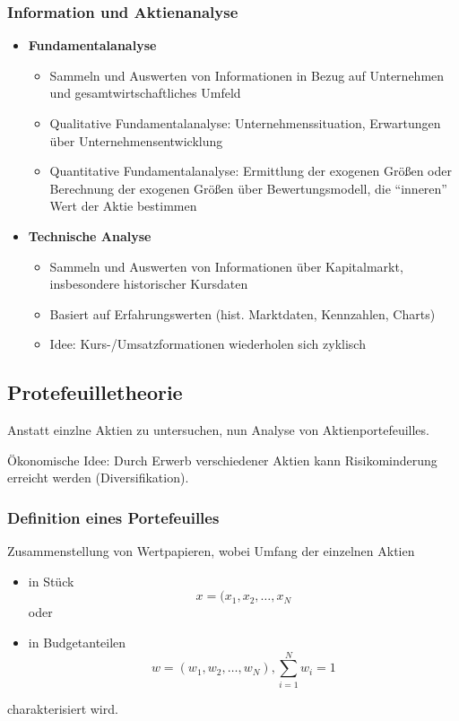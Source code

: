 \subsubsection{Information und Aktienanalyse}
\begin{itemize}
	\item \textbf{Fundamentalanalyse}
	\begin{itemize}
		\item Sammeln und Auswerten von Informationen in Bezug auf Unternehmen und gesamtwirtschaftliches Umfeld
		\item Qualitative Fundamentalanalyse: Unternehmenssituation, Erwartungen über Unternehmensentwicklung
		\item Quantitative Fundamentalanalyse: Ermittlung der exogenen Größen oder Berechnung der exogenen Größen über Bewertungsmodell, die "`inneren"' Wert der Aktie bestimmen
	\end{itemize}
	\item \textbf{Technische Analyse}
	\begin{itemize}
		\item Sammeln und Auswerten von Informationen über Kapitalmarkt, insbesondere historischer Kursdaten
		\item Basiert auf Erfahrungswerten (hist. Marktdaten, Kennzahlen, Charts)
		\item Idee: Kurs-/Umsatzformationen wiederholen sich zyklisch
	\end{itemize}
\end{itemize}


\subsection{Protefeuilletheorie}
Anstatt einzlne Aktien zu untersuchen, nun Analyse von Aktienportefeuilles.

Ökonomische Idee: Durch Erwerb verschiedener Aktien kann Risikominderung erreicht werden (Diversifikation).

\subsubsection{Definition eines Portefeuilles}
Zusammenstellung von Wertpapieren, wobei Umfang der einzelnen Aktien
\begin{itemize}
	\item in Stück \[x = (x_1, x_2, \dots , x_N\] oder
	\item in Budgetanteilen \[w = (w_1, w_2, \dots , w_N), \sum_{i=1}^{N} w_i = 1\]
\end{itemize}
charakterisiert wird.

